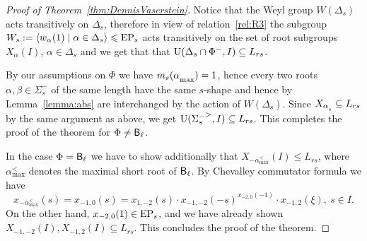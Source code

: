 \begin{proof}[Proof of Theorem~\ref{thm:DennisVaserstein}]
Notice that the Weyl group $W(\Delta_s)$ acts transitively on $\Delta_s$, therefore in view of relation~\ref{rel:R3} the subgroup
$W_s := \langle w_\alpha(1) \mid \alpha\in\Delta_s\rangle \leqslant \operatorname{EP}_s$ acts transitively on the set of root subgroups $X_\alpha(I)$, $\alpha\in \Delta_s$
and we get that that $\operatorname{U}(\Delta_s \cap \Phi^-, I)\subseteq L_{rs}$.

By our assumptions on $\Phi$ we have $m_s(\alpha\ssub{\mathrm{max}})=1$, hence every two roots $\alpha, \beta \in \Sigma^-_s$ of the same length
have the same $s$-shape and
hence by Lemma~\ref{lemma:abs} are interchanged by the action of $W(\Delta_s)$. %
Since $X_{\alpha\ssub{s}} \subseteq L_{rs}$ by the same argument as above, we get $\operatorname{U}({\Sigma^-_s}^>, I)\subseteq L_{rs}$.
This completes the proof of the theorem for $\Phi\neq \mathsf{B}_\ell$. 

In the case $\Phi=\mathsf{B}_\ell$ we have to show additionally that $X_{-\alpha^<_{\mathrm{max}}}(I) \leqslant L_{rs}$, where $\alpha^<_{\mathrm{max}}$
denotes the maximal short root of $\mathsf{B}_\ell$.
By Chevalley commutator formula we have
\[ x_{-{\alpha^<_{\mathrm{max}}}}(s) = x_{-1,0}(s) = x_{1,-2}(s) \cdot x_{-1,-2}(-s)^{x_{-2, 0}(-1)} \cdot x_{-1, 2}(\xi),\ s\in I. \]
On the other hand, $x_{-2,0}(1) \in \operatorname{EP}_s$, and we have already shown $X_{-1,-2}(I), X_{-1, 2}(I) \subseteq L_{rs}$.
This concludes the proof of the theorem.
\end{proof}
